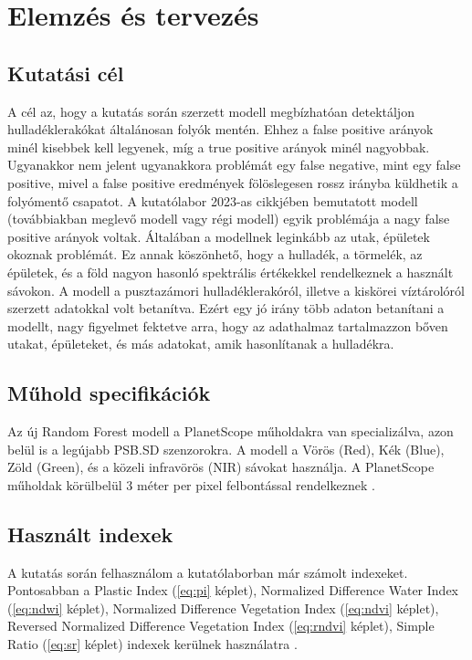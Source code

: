 \chapter{Elemzés és tervezés}
\label{ch:spec}

\section{Kutatási cél}
\label{ch:goals}

A cél az, hogy a kutatás során szerzett modell megbízhatóan detektáljon hulladéklerakókat általánosan folyók mentén. Ehhez a false positive arányok minél kisebbek kell legyenek, míg a true positive arányok minél nagyobbak. Ugyanakkor nem jelent ugyanakkora problémát egy false negative, mint egy false positive, mivel a false positive eredmények fölöslegesen rossz irányba küldhetik a folyómentő csapatot. 
A kutatólabor 2023-as cikkjében bemutatott modell (továbbiakban meglevő modell vagy régi modell) \cite{magyar2023} egyik problémája a nagy false positive arányok voltak. Általában a modellnek leginkább az utak, épületek okoznak problémát. Ez annak köszönhető, hogy a hulladék, a törmelék, az épületek, és a föld nagyon hasonló spektrális értékekkel rendelkeznek a használt sávokon. A modell a pusztazámori hulladéklerakóról, illetve a kiskörei víztárolóról szerzett adatokkal volt betanítva. Ezért egy jó irány több adaton betanítani a modellt, nagy figyelmet fektetve arra, hogy az adathalmaz tartalmazzon bőven utakat, épületeket, és más adatokat, amik hasonlítanak a hulladékra. 

\section{Műhold specifikációk}

Az új Random Forest modell a PlanetScope műholdakra van specializálva, azon belül is a legújabb PSB.SD szenzorokra. A modell a Vörös (Red), Kék (Blue), Zöld (Green), és a közeli infravörös (NIR) sávokat használja. A PlanetScope műholdak körülbelül 3 méter per pixel felbontással rendelkeznek \cite{planetsensors2024}.

\section{Használt indexek}

A kutatás során felhasználom a kutatólaborban már számolt indexeket. Pontosabban a Plastic Index (\ref{eq:pi} képlet), Normalized Difference Water Index (\ref{eq:ndwi} képlet), Normalized Difference Vegetation Index (\ref{eq:ndvi} képlet), Reversed Normalized Difference Vegetation Index (\ref{eq:rndvi} képlet), Simple Ratio (\ref{eq:sr} képlet) indexek kerülnek használatra \cite{Themistocleous2020, magyar2023}.

